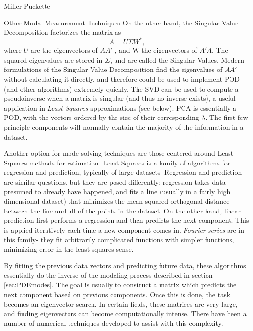 \documentclass[a4paper,10pt]{report}
\numberwithin{equation}{section}
\begin{document}
\begin{chapter}{Miller Puckette}
\begin{section}{Other Modal Measurement Techniques}
On the other hand, the Singular Value Decomposition factorizes the matrix as
\begin{equation}
A = U\Sigma W^* , 
\end{equation}
where $U$ are the eigenvectors of $A A'$ , and W the eigenvectors of $A'A$. The squared eigenvalues are stored in $\Sigma$, and are called the Singular Values. Modern formulations of the Singular Value Decomposition find the eigenvalues of $A A'$ without calculating it directly, and therefore could be used to implement POD (and other algorithms) extremely quickly. \cite[p.~368]{Watkins2010} The SVD can be used to compute a pseudoinverse when a matrix is singular (and thus no inverse exists), a useful application in \emph{Least Squares} approximations (see below). PCA is essentially a POD, with the vectors ordered by the size of their corresponding $\lambda$. The first few principle components will normally contain the majority of the information in a dataset. \cite[p.~4]{Fodor2002} 

Another option for mode-solving techniques are those centered around Least Squares methods for estimation. Least Squares is a family of algorithms for regression and prediction, typically of large datasets. Regression and prediction are similar questions, but they are posed differently: regression takes data presumed to already have happened, and fits a line (usually in a fairly high dimensional dataset) that minimizes the mean squared orthogonal distance between the line and all of the points in the dataset. On the other hand, linear prediction first performs a regression and then predicts the next component. This is applied iteratively each time a new component comes in. \emph{Fourier series} are in this family- they fit arbitrarily complicated functions with simpler functions, minimizing error in the least-squares sense. \cite[p.~224]{Strang2009} 

By fitting the previous data vectors and predicting future data, these algorithms essentially do the inverse of the modeling process described in section \ref{sec:PDEmodes}. The goal is usually to construct a matrix which predicts the next component based on previous components. Once this is done, the task becomes an eigenvector search. In certain fields, these matrices are very large, and finding eigenvectors can become computationally intense. There have been a number of numerical techniques developed to assist with this complexity. 


\end{section}
\end{chapter}
\end{document}
